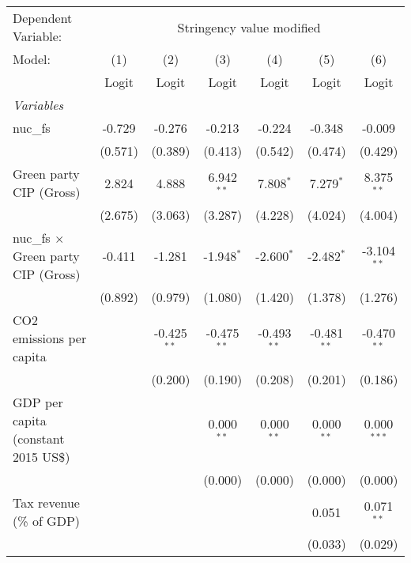 
\begingroup
\centering
\begin{tabular}{lcccccc}
   \toprule
   Dependent Variable: & \multicolumn{6}{c}{Stringency value modified}\\
   Model:                                     & (1)     & (2)           & (3)           & (4)           & (5)           & (6)\\  
                                              &  Logit  & Logit         & Logit         & Logit         & Logit         & Logit\\  
   \midrule
   \emph{Variables}\\
   nuc\_fs                                    & -0.729  & -0.276        & -0.213        & -0.224        & -0.348        & -0.009\\   
                                              & (0.571) & (0.389)       & (0.413)       & (0.542)       & (0.474)       & (0.429)\\   
   Green party CIP (Gross)                    & 2.824   & 4.888         & 6.942$^{**}$  & 7.808$^{*}$   & 7.279$^{*}$   & 8.375$^{**}$\\   
                                              & (2.675) & (3.063)       & (3.287)       & (4.228)       & (4.024)       & (4.004)\\   
   nuc\_fs $\times$ Green party CIP (Gross)   & -0.411  & -1.281        & -1.948$^{*}$  & -2.600$^{*}$  & -2.482$^{*}$  & -3.104$^{**}$\\   
                                              & (0.892) & (0.979)       & (1.080)       & (1.420)       & (1.378)       & (1.276)\\   
   CO2 emissions per capita                   &         & -0.425$^{**}$ & -0.475$^{**}$ & -0.493$^{**}$ & -0.481$^{**}$ & -0.470$^{**}$\\   
                                              &         & (0.200)       & (0.190)       & (0.208)       & (0.201)       & (0.186)\\   
   GDP per capita (constant 2015 US\$)        &         &               & 0.000$^{**}$  & 0.000$^{**}$  & 0.000$^{**}$  & 0.000$^{***}$\\   
                                              &         &               & (0.000)       & (0.000)       & (0.000)       & (0.000)\\   
   Tax revenue (\% of GDP)                    &         &               &               &               & 0.051         & 0.071$^{**}$\\   
                                              &         &               &               &               & (0.033)       & (0.029)\\   

\end{tabular}
